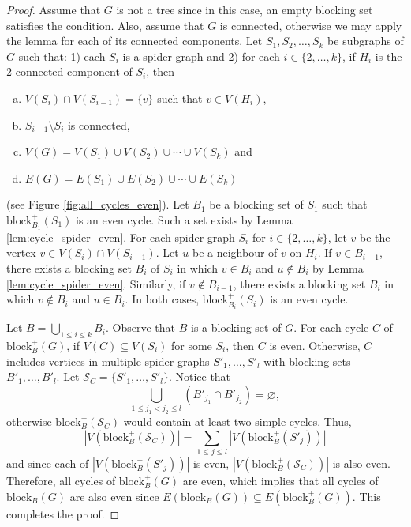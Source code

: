 \documentclass{patmorin}
\let\emptyset\varnothing
\newcommand{\block}{\mathrm{block}}
\begin{document}
\begin{proof}
 Assume that $G$ is not a tree since in this case, an empty blocking set satisfies the condition. Also, assume that $G$ is connected, otherwise we may apply the lemma for each of its connected components. Let $S_1,S_2,\ldots,S_k$ be subgraphs of $G$ such that: 1) each $S_i$ is a spider graph and 2) for each $i \in \{2,\ldots,k\}$, if $H_i$ is the 2-connected component of $S_i$, then
\begin{enumerate}[a)]
 \item $V(S_i) \cap V(S_{i-1}) = \{v\}$ such that $v \in V(H_i)$,
 \item $S_{i-1} \setminus S_i$ is connected,
 \item $V(G)= V(S_1) \cup V(S_2) \cup \cdots \cup V(S_k)$ and
 \item $E(G)= E(S_1) \cup E(S_2) \cup \cdots \cup E(S_k)$
\end{enumerate} 
 (see Figure \ref{fig:all_cycles_even}). Let $B_1$ be a blocking set of $S_1$ such that $\block_{B_1}^+(S_1)$ is an even cycle. Such a set exists by Lemma \ref{lem:cycle_spider_even}. For each spider graph $S_i$ for $i \in \{2,\ldots,k\}$, let $v$ be the vertex $v \in V(S_i) \cap V(S_{i-1})$. Let $u$ be a neighbour of $v$ on $H_i$. If $v \in B_{i-1}$, there exists a blocking set $B_i$ of $S_i$ in which $v \in B_i$ and $u \notin B_i$ by Lemma \ref{lem:cycle_spider_even}. Similarly, if $v \notin B_{i-1}$, there exists a blocking set $B_i$ in which $v \notin B_i$ and $u \in B_i$. In both cases, $\block_{B_i}^+(S_i)$ is an even cycle.
 
 Let $B = \bigcup_{1 \leq i \leq k} B_i$. Observe that $B$ is a blocking set of $G$. For each cycle $C$ of $\block_{B}^+(G)$, if $V(C) \subseteq V(S_i)$ for some $S_i$, then $C$ is even. Otherwise, $C$ includes vertices in multiple spider graphs $S'_1,\ldots,S'_l$ with blocking sets $B'_1,\ldots,B'_l$. Let $\mathcal{S}_C = \{S'_1,\ldots,S'_l\}$. Notice that
 \begin{equation}
  \bigcup_{1 \leq j_1 < j_2 \leq l} (B'_{j_1} \cap B'_{j_2}) = \emptyset,
 \end{equation}
 otherwise $\block_{B}^+(\mathcal{S}_C)$ would contain at least two simple cycles. Thus, 
 \begin{equation}
 \left|V(\block_{B}^+(\mathcal{S}_C))\right|= \sum_{1 \leq j \leq l} |V(\block_{B}^+(S'_j))|
 \end{equation}
 and since each of $|V(\block_{B}^+(S'_j))|$ is even, $|V(\block_{B}^+(\mathcal{S}_C))|$ is also even. Therefore, all cycles of $\block_{B}^+(G)$ are even, which implies that all cycles of $\block_{B}(G)$ are also even since $E(\block_{B}(G)) \subseteq E(\block_{B}^+(G))$. This completes the proof.
\end{proof}
\end{document}
